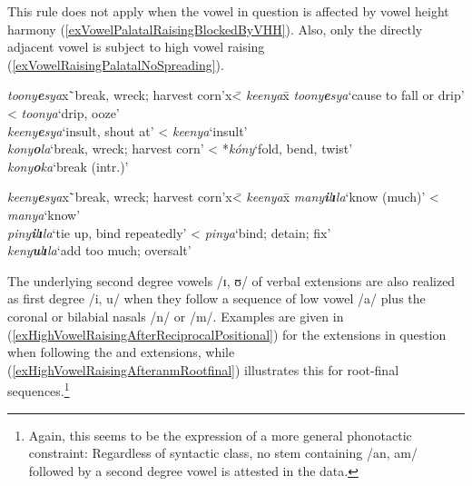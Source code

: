 This rule does not apply when the vowel in question is affected by vowel height harmony (\ref{exVowelPalatalRaisingBlockedByVHH}). Also, only the directly adjacent vowel is subject to high vowel raising (\ref{exVowelRaisingPalatalNoSpreading}).

\begin{exe}
\ex \label{exVowelPalatalRaisingBlockedByVHH} 
\begin{tabbing}
\textit{toony\textbf{e}sya}x\=`break, wreck; harvest corn'x\=< \textit{keenya}x\=\kill%
\textit{toony\textbf{e}sya}\>`cause to fall or drip'\> < \textit{toonya}\>`drip, ooze'\\ 
\textit{keeny\textbf{e}sya}\>`insult, shout at'\> < \textit{keenya}\>`insult'\\
\textit{kony\textbf{o}la}\>`break, wreck; harvest corn'\> < *\textit{kóny}\>`fold, bend, twist'\\
\textit{kony\textbf{o}ka}\>`break (intr.)'
\end{tabbing}
\ex\label{exVowelRaisingPalatalNoSpreading}
\begin{tabbing}
\textit{keeny\textbf{e}sya}x\=`break, wreck; harvest corn'x\=< \textit{keenya}x\=\kill%
\textit{many\textbf{i}l\textbf{ɪ}la}\>`know (much)'\> < \textit{manya}\>`know'\\
\textit{piny\textbf{i}l\textbf{ɪ}la}\>`tie up, bind repeatedly'\> < \textit{pinya}\>`bind; detain; fix'\\
\textit{keny\textbf{u}l\textbf{ɪ}la}\>`add too much; oversalt'
\end{tabbing}
\end{exe}

The underlying second degree vowels /ɪ, ʊ/ of verbal extensions are also realized as first degree /i, u/ when they follow a sequence of low vowel /a/ plus the coronal or bilabial nasals /n/ or /m/. Examples are given in (\ref{exHighVowelRaisingAfterReciprocalPositional}) for the extensions in question when following the  and  extensions, while (\ref{exHighVowelRaisingAfteranmRootfinal}) illustrates this for root-final sequences.\footnote{Again, this seems to be the expression of a more general phonotactic constraint: Regardless of syntactic class, no stem containing /an, am/ followed by a second degree vowel is attested in the data.}

